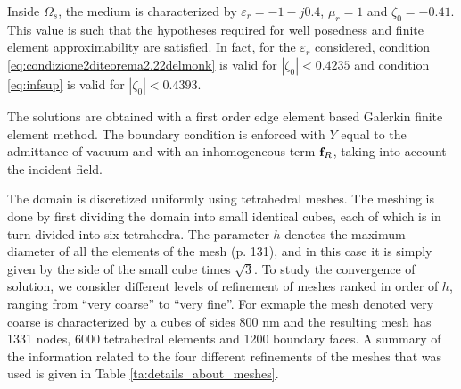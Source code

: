 Inside $\Omega_s$, the medium is characterized by $\varepsilon_r = -1 - j0.4$, 
$\mu_r = 1$ and $\zeta_0 = -0.41$. 
This value is such that the hypotheses required for well posedness and 
finite element approximability are satisfied.
In fact, for the $\varepsilon_r$ considered, condition \ref{eq:condizione2diteorema2.22delmonk} 
is valid for $|\zeta_0| < 0.4235$ and condition \ref{eq:infsup} is valid for 
$|\zeta_0| < 0.4393$.

The solutions are obtained with a first order edge element based Galerkin 
finite element method. The boundary condition is enforced with $Y$ equal to 
the admittance of vacuum and with an inhomogeneous term ${\bf f}_R$, 
taking into account the incident field. 

The domain is discretized uniformly using tetrahedral meshes.
The meshing is done by first dividing the domain into small identical cubes,
each of which is in turn divided into six tetrahedra.
The parameter $h$ denotes the maximum diameter of all the elements of the 
mesh \cite{handbook} (p. 131), and in this case it is simply given by the side of 
the small cube times $\sqrt{3}$.
To study the convergence of solution, we consider different levels 
of refinement of meshes ranked in order of $h$,
ranging from ``very coarse'' to ``very fine''.
For exmaple the mesh denoted very coarse is characterized by a cubes of sides 
800 nm and the resulting mesh has 1331 nodes, 6000 tetrahedral elements and 
1200 boundary faces.
A summary of the information related to 
the four different refinements of the meshes that was used 
is given in Table \ref{ta:details_about_meshes}.


